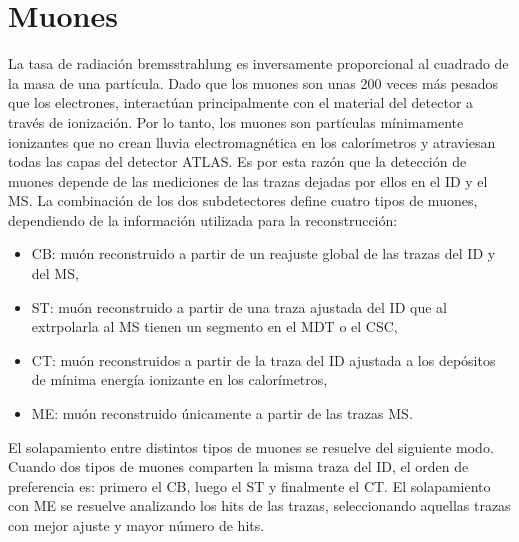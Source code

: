 \section{Muones}



La tasa de radiación bremsstrahlung es inversamente proporcional al cuadrado de la masa de una partícula. Dado que los muones son unas 200 veces más pesados que los electrones, interactúan principalmente con el material del detector a través de ionización. Por lo tanto, los muones son partículas mínimamente ionizantes que no crean lluvia electromagnética en los calorímetros y atraviesan todas las capas del detector \ac{ATLAS}. Es por esta raz\'on que la detección de muones depende de las mediciones de las trazas dejadas por ellos en el \ac{ID} y el \ac{MS}. La combinación de los dos subdetectores define cuatro tipos de muones, dependiendo de la información utilizada para la reconstrucción:
\begin{itemize}
    \item \ac{CB}: mu\'on reconstruido a partir de un reajuste global de las trazas del \ac{ID} y del \ac{MS},
    \item \ac{ST}: mu\'on reconstruido a partir de una traza ajustada del \ac{ID} que al extrpolarla al \ac{MS} tienen un segmento en el \ac{MDT} o el \ac{CSC},
    \item \ac{CT}: mu\'on reconstruidos a partir de la traza del \ac{ID} ajustada a los depósitos de mínima energía ionizante en los calorímetros,
    \item \ac{ME}: mu\'on reconstruido únicamente a partir de las trazas \ac{MS}.
\end{itemize}

El solapamiento entre distintos tipos de muones se resuelve del siguiente modo. Cuando dos tipos de muones comparten la misma traza del \ac{ID}, el orden de preferencia es: primero el \ac{CB}, luego el \ac{ST} y finalmente el \ac{CT}. El solapamiento con \ac{ME} se resuelve analizando los hits de las trazas, seleccionando aquellas trazas con mejor ajuste y mayor número de hits.

